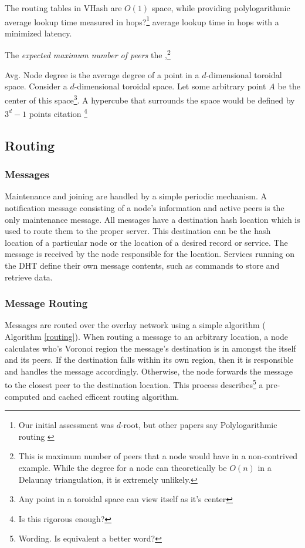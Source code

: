 \documentclass{IEEEtran}
\begin{document}
The routing tables in VHash are $O(1)$ space, while providing polylogarithmic  average lookup time measured in hops?\footnote{Our initial assessment was $d$-root, but other papers say Polylogarithmic routing \cite{kleinberg2000navigation} \cite{raynet}} average lookup time in hops with a minimized latency.



The \textit{expected maximum number of peers} the ,\footnote{This is maximum number of peers that a node would have in a non-contrived example.  While the degree for a node can theoretically be $O(n)$ in a Delaunay triangulation, it is extremely unlikely.}


Avg. Node degree is the average degree of a point in a $d$-dimensional toroidal space.  
Consider a $d$-dimensional toroidal space.  Let some arbitrary point $A$ be the center of this space\footnote{Any point in a toroidal space can view itself as it's center}.  A hypercube that surrounds the space would be defined by $3^d -1$ points citation \footnote{Is this rigorous enough?}






\subsection{Routing}

\subsubsection{Messages}
Maintenance and joining are handled by a simple periodic mechanism. A notification message consisting of a node's information and active peers is the only maintenance message. All messages have a destination hash location which is used to route them to the proper server. This destination can be the hash location of a particular node or the location of a desired record or service.  The message is received by the node responsible for the location. Services running on the DHT define their own message contents, such as commands to store and retrieve data.

\subsubsection{Message Routing}
Messages are routed over the overlay network using a simple algorithm ( Algorithm \ref{routing}). 
When routing a message to an arbitrary location, a node calculates who's Voronoi region the message's destination is in amongst the itself and its peers. If the destination falls within its own region, then it is responsible and handles the message accordingly. Otherwise, the node forwards the message to the closest peer to the destination location. This process describes\footnote{Wording.  Is equivalent a better word?} a pre-computed and cached efficent routing algorithm.
\end{document}

